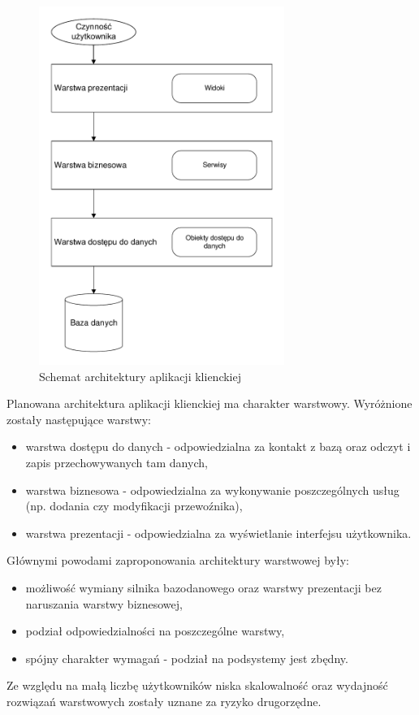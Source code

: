 \documentclass[10pt,a4paper]{article}
\begin{document}
\begin{figure}[H]
	\centering
	\includegraphics[width=8cm]{architecture-fat-client.pdf}
	\caption{Schemat architektury aplikacji klienckiej}
\end{figure}
Planowana architektura aplikacji klienckiej ma charakter warstwowy. Wyróżnione zostały następujące warstwy:
\begin{itemize}
\item warstwa dostępu do danych - odpowiedzialna za kontakt z bazą oraz odczyt i zapis przechowywanych tam danych,
\item warstwa biznesowa - odpowiedzialna za wykonywanie poszczególnych usług (np. dodania czy modyfikacji przewoźnika),
\item warstwa prezentacji - odpowiedzialna za wyświetlanie interfejsu użytkownika.
\end{itemize}
Głównymi powodami zaproponowania architektury warstwowej były:
\begin{itemize}
\item możliwość wymiany silnika bazodanowego oraz warstwy prezentacji bez naruszania warstwy biznesowej,
\item podział odpowiedzialności na poszczególne warstwy,
\item spójny charakter wymagań - podział na podsystemy jest zbędny.
\end{itemize}
Ze względu na małą liczbę użytkowników niska skalowalność oraz wydajność rozwiązań warstwowych zostały uznane za ryzyko drugorzędne.
\end{document}
